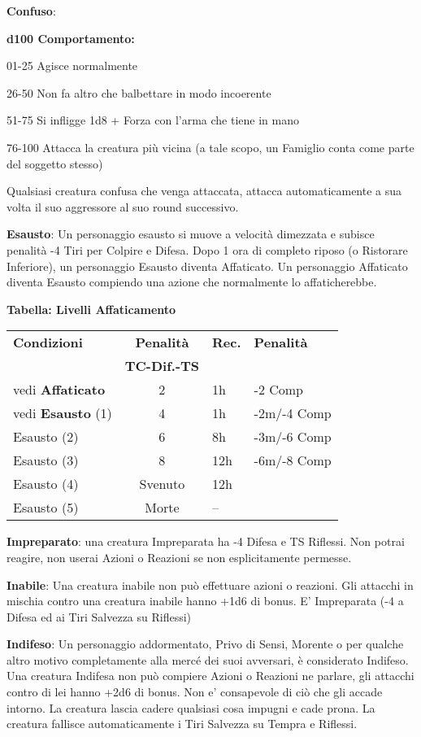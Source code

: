 \documentclass[a4paper,12 pt,openany]{book}
\begin{document}
\begin{textblock*}{19 cm}
\begin{multicols}{2}
\textbf{Confuso}: 

\textbf{d100 Comportamento:}

01-25 Agisce normalmente

26-50 Non fa altro che balbettare in modo incoerente

51-75 Si infligge 1d8 + Forza con l'arma che tiene in mano

76-100 Attacca la creatura più vicina (a tale scopo, un Famiglio conta come parte del soggetto stesso)

Qualsiasi creatura confusa che venga attaccata, attacca automaticamente a sua volta il suo aggressore al suo round successivo.

\textbf{Esausto}: Un personaggio esausto si muove a velocità dimezzata e subisce penalità -4 Tiri per Colpire e Difesa. Dopo 1 ora di completo riposo (o Ristorare Inferiore), un personaggio Esausto diventa Affaticato. Un personaggio Affaticato diventa Esausto compiendo una azione che normalmente lo affaticherebbe.

\medskip

\textbf{Tabella: Livelli Affaticamento}

\medskip

\begin{tabularx}{0.45\textwidth}{lcll}
\textbf{Condizioni}& \textbf{Penalità}&\textbf{Rec.}&\textbf{Penalità}\\
&\textbf{TC-Dif.-TS}&&\\
\hline
vedi \textbf{Affaticato} &2&1h&-2 Comp\\
vedi \textbf{Esausto} (1)&4&1h&-2m/-4 Comp\\
Esausto (2) &6&8h&-3m/-6 Comp\\
Esausto (3) &8&12h&-6m/-8 Comp\\
Esausto (4) &Svenuto&12h&\\
Esausto (5) &Morte&--&\\
\end{tabularx}

\textbf{Impreparato}: una creatura Impreparata ha -4 Difesa e TS Riflessi. Non potrai reagire, non userai Azioni o Reazioni se non esplicitamente permesse.

\textbf{Inabile}: Una creatura inabile non può effettuare azioni o reazioni. Gli attacchi in mischia contro una creatura inabile hanno +1d6 di bonus. E' Impreparata (-4 a Difesa ed ai Tiri Salvezza su Riflessi)

\textbf{Indifeso}: Un personaggio addormentato, Privo di Sensi, Morente o per qualche altro motivo completamente alla mercé dei suoi avversari, è considerato Indifeso. Una creatura Indifesa non può compiere Azioni o Reazioni ne parlare, gli attacchi contro di lei hanno +2d6 di bonus. Non e' consapevole di ciò che gli accade intorno. La creatura lascia cadere qualsiasi cosa impugni e cade prona. La creatura fallisce automaticamente i Tiri Salvezza su Tempra e Riflessi.


\end{multicols}
\end{textblock*}
\end{document}
